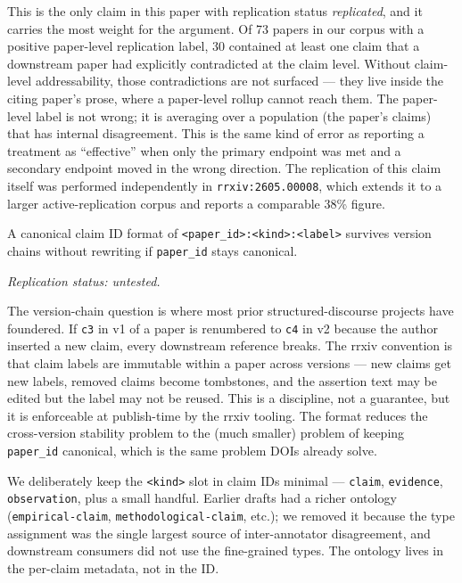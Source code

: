 \documentclass{rrxiv}
\begin{document}
This is the only claim in this paper with replication status \emph{replicated}, and it carries the most weight for the argument. Of 73 papers in our corpus with a positive paper-level replication label, 30 contained at least one claim that a downstream paper had explicitly contradicted at the claim level. Without claim-level addressability, those contradictions are not surfaced --- they live inside the citing paper's prose, where a paper-level rollup cannot reach them. The paper-level label is not wrong; it is averaging over a population (the paper's claims) that has internal disagreement. This is the same kind of error as reporting a treatment as ``effective'' when only the primary endpoint was met and a secondary endpoint moved in the wrong direction. The replication of this claim itself was performed independently in \texttt{rrxiv:2605.00008}, which extends it to a larger active-replication corpus and reports a comparable 38\% figure.

\begin{claim}[type=methodological, evidence=argument, confidence=0.85, rationale={Holds by construction given label immutability, which is a publish-time-enforceable discipline rather than a guarantee; the residual risk is paper-id canonicality drift}, labels={identifiers, versioning, protocol-design}, title={Claim 5: stable claim IDs}]
\label{claim:c5}
A canonical claim ID format of \texttt{<paper\_id>:<kind>:<label>} survives version chains without rewriting if \texttt{paper\_id} stays canonical.

\emph{Replication status: untested.}
\end{claim}

The version-chain question is where most prior structured-discourse projects have foundered. If \texttt{c3} in v1 of a paper is renumbered to \texttt{c4} in v2 because the author inserted a new claim, every downstream reference breaks. The rrxiv convention is that claim labels are immutable within a paper across versions --- new claims get new labels, removed claims become tombstones, and the assertion text may be edited but the label may not be reused. This is a discipline, not a guarantee, but it is enforceable at publish-time by the rrxiv tooling. The format reduces the cross-version stability problem to the (much smaller) problem of keeping \texttt{paper\_id} canonical, which is the same problem DOIs already solve.

\begin{rrxivremark}
We deliberately keep the \texttt{<kind>} slot in claim IDs minimal --- \texttt{claim}, \texttt{evidence}, \texttt{observation}, plus a small handful. Earlier drafts had a richer ontology (\texttt{empirical-claim}, \texttt{methodological-claim}, etc.); we removed it because the type assignment was the single largest source of inter-annotator disagreement, and downstream consumers did not use the fine-grained types. The ontology lives in the per-claim metadata, not in the ID.
\end{rrxivremark}
\end{document}
